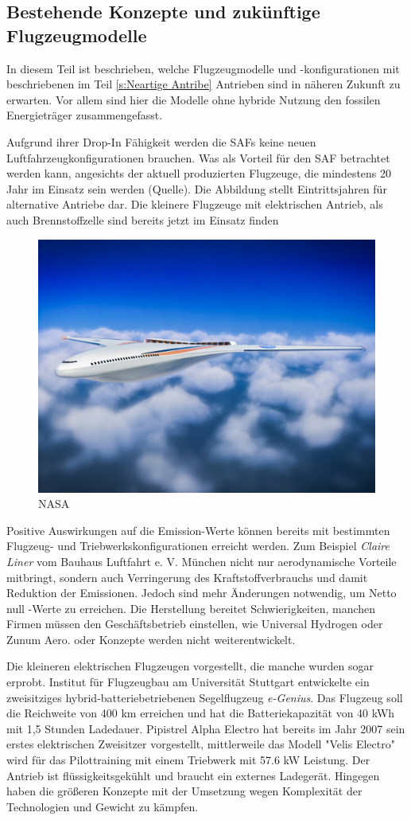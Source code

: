 \subsection{Bestehende Konzepte und zukünftige Flugzeugmodelle}
In diesem Teil ist beschrieben, welche Flugzeugmodelle und -konfigurationen mit beschriebenen im Teil \ref{s:Neartige Antribe} Antrieben
sind in näheren Zukunft zu erwarten. Vor allem sind hier die Modelle ohne hybride Nutzung den fossilen Energieträger zusammengefasst.

Aufgrund ihrer Drop-In Fähigkeit werden die SAFs keine neuen Luftfahrzeugkonfigurationen brauchen. Was als Vorteil für den SAF betrachtet werden kann,
angesichts der aktuell produzierten Flugzeuge, die mindestens 20 Jahr im Einsatz sein werden (Quelle).
Die Abbildung stellt Eintrittsjahren für alternative Antriebe dar.
Die kleinere Flugzeuge mit elektrischen Antrieb, als auch Brennstoffzelle sind bereits jetzt im Einsatz finden
%
\begin{figure}[h]
	\centering
	\includegraphics[width=0.6\linewidth]{Bilder/NASA.jpg}
	\caption[NASA]{NASA}
	\label{NASA_konfig}
\end{figure}
%
Positive Auswirkungen auf die Emission-Werte können bereits mit bestimmten Flugzeug- und Triebwerkskonfigurationen erreicht werden.
Zum Beispiel \textit{Claire Liner} vom Bauhaus Luftfahrt e. V. München nicht nur aerodynamische Vorteile mitbringt, 
sondern auch Verringerung des Kraftstoffverbrauchs und damit Reduktion der Emissionen.
Jedoch sind mehr Änderungen notwendig, um Netto null -Werte zu erreichen.
Die Herstellung bereitet Schwierigkeiten, manchen Firmen müssen den Geschäftsbetrieb einstellen, wie Universal Hydrogen oder Zunum Aero.
oder Konzepte werden nicht weiterentwickelt.

Die kleineren elektrischen Flugzeugen vorgestellt, die manche wurden sogar erprobt.
Institut für Flugzeugbau am Universität Stuttgart entwickelte ein zweisitziges hybrid-batteriebetriebenen Segelflugzeug \textit{e-Genius}. Das Flugzeug soll
die Reichweite von 400 km erreichen und hat die Batteriekapazität von 40 kWh mit 1,5 Stunden Ladedauer. %
Pipistrel Alpha Electro hat bereits im Jahr 2007 sein erstes elektrischen Zweisitzer vorgestellt, mittlerweile das Modell "Velis Electro" \cite{Pipistrel_VelisElectro} wird
für das Pilottraining mit einem Triebwerk mit 57.6 kW Leistung. Der Antrieb ist flüssigkeitsgekühlt und braucht ein externes Ladegerät.
Hingegen haben die größeren Konzepte mit der Umsetzung wegen Komplexität der Technologien und Gewicht zu kämpfen.\\


